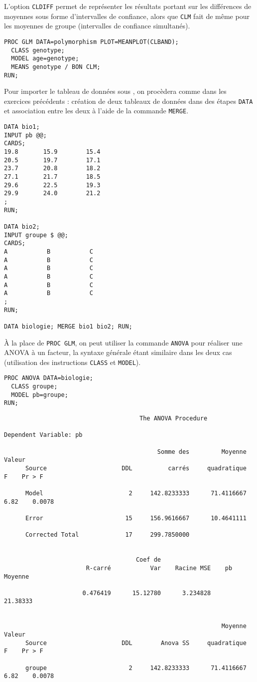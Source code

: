 L'option \texttt{CLDIFF} permet de représenter les résultats portant sur les
différences de moyennes sous forme d'intervalles de confiance, alors que
\texttt{CLM} fait de même pour les moyennes de groupe (intervalles de
confiance simultanés).
\begin{verbatim}
PROC GLM DATA=polymorphism PLOT=MEANPLOT(CLBAND); 
  CLASS genotype; 
  MODEL age=genotype;
  MEANS genotype / BON CLM;
RUN;
\end{verbatim}
%
%
%
\soln{\ref{exo:9.6}}
Pour importer le tableau de données sous \SAS, on procèdera comme dans les
exercices précédents : création de deux tableaux de données dans des étapes
\texttt{DATA} et association entre les deux à l'aide de la commande
\texttt{MERGE}.
\begin{verbatim}
DATA bio1;
INPUT pb @@;
CARDS;
19.8       15.9        15.4
20.5       19.7        17.1
23.7       20.8        18.2
27.1       21.7        18.5
29.6       22.5        19.3
29.9       24.0        21.2
;
RUN;

DATA bio2;
INPUT groupe $ @@;
CARDS;
A           B           C
A           B           C
A           B           C
A           B           C
A           B           C
A           B           C
;
RUN;

DATA biologie; MERGE bio1 bio2; RUN;
\end{verbatim}

À la place de \texttt{PROC GLM}, on peut utiliser la commande \texttt{ANOVA}
pour réaliser une ANOVA à un facteur, la syntaxe générale étant similaire
dans les deux cas (utilisation des instructions \texttt{CLASS} et
\texttt{MODEL}). 
\begin{verbatim}
PROC ANOVA DATA=biologie; 
  CLASS groupe; 
  MODEL pb=groupe;
RUN;
\end{verbatim}

\begin{verbatim}
                                      The ANOVA Procedure

Dependent Variable: pb

                                           Somme des         Moyenne     Valeur
      Source                     DDL          carrés     quadratique          F    Pr > F

      Model                        2     142.8233333      71.4116667       6.82    0.0078

      Error                       15     156.9616667      10.4641111

      Corrected Total             17     299.7850000


                                     Coef de
                       R-carré           Var    Racine MSE    pb Moyenne

                      0.476419      15.12780      3.234828      21.38333


                                                             Moyenne     Valeur
      Source                     DDL        Anova SS     quadratique          F    Pr > F

      groupe                       2     142.8233333      71.4116667       6.82    0.0078
\end{verbatim}

